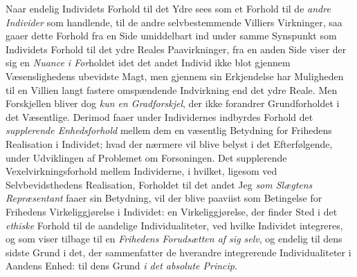 Naar endelig Individets Forhold til det Ydre sees som et Forhold til de
\emph{andre Individer} som handlende, til de andre selvbestemmende Villiers
Virkninger, saa gaaer dette Forhold fra en Side umiddelbart ind under samme
Synspunkt som Individets Forhold til det ydre Reales Paavirkninger, fra en anden
Side viser der sig en \emph{Nuance i For}holdet idet det andet Individ ikke blot
gjennem Væsenslighedens ubevidste Magt, men gjennem sin Erkjendelse har
Muligheden til en Villien langt fastere omspændende Indvirkning end det ydre
Reale. Men Forskjellen bliver dog \emph{kun en Gradforskjel}, der ikke forandrer
Grundforholdet i det Væsentlige. Derimod faaer under Individernes indbyrdes
Forhold det \emph{supplerende Enhedsforhold} mellem dem en væsentlig Betydning
for Frihedens Realisation i Individet; hvad der nærmere vil blive belyst i det
Efterfølgende, under Udviklingen af Problemet om Forsoningen. Det supplerende
Vexelvirkningsforhold mellem Individerne, i hvilket, ligesom ved
Selvbevidsthedens Realisation, Forholdet til det andet Jeg \emph{som Slægtens
Repræsentant} faaer sin Betydning, vil der blive paaviist som Betingelse for
Frihedens Virkeliggjørelse i Individet: en Virkeliggjørelse, der finder Sted i
det \emph{ethiske} Forhold til de aandelige Individualiteter, ved hvilke
Individet integreres, og som viser tilbage til en \emph{Frihedens Forudsætten af
sig selv}, og endelig til dens sidste Grund i det, der sammenfatter de hverandre
integrerende Individualiteter i Aandens Enhed: til dens Grund \emph{i det
absolute Princip}.

